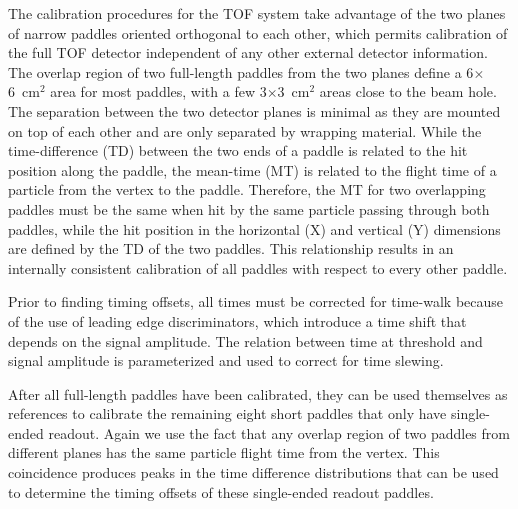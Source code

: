 The calibration procedures for the TOF system take advantage of the two
planes of narrow paddles oriented orthogonal to each other, which permits calibration of the full TOF detector independent
of any other external detector information. The overlap region of two full-length paddles from the two planes define
a 6$\times$6~cm$^2$ area for most paddles, with a few 3$\times$3~cm$^2$ areas close to the beam hole. The separation between the two detector planes is minimal as they are mounted on top of each other and are only separated by wrapping
material. While the time-difference (TD) between the two ends of a paddle is related to the hit position along the paddle,
the mean-time (MT) is related to the flight time of a particle from the vertex to the paddle. Therefore, the MT for two overlapping
paddles must be the same when hit by the same particle passing through both paddles, while the hit position in the horizontal (X) and vertical (Y) dimensions are defined by the TD of the two paddles. This relationship results in an internally consistent calibration of all paddles with respect to every other paddle.

Prior to finding timing offsets, all times must be corrected for time-walk because of the use of leading edge discriminators, which
introduce a time shift that depends on the signal amplitude. The relation between time at threshold and signal amplitude is parameterized and used to correct for time slewing.

After all full-length paddles have been calibrated, they can be used themselves as references to
calibrate the remaining eight short paddles that only have single-ended readout.  Again we use the fact that any overlap region of two paddles from different
planes has the same particle flight time from the vertex. This coincidence produces peaks in the time difference distributions that can be used to determine the timing offsets of these single-ended readout paddles. 

